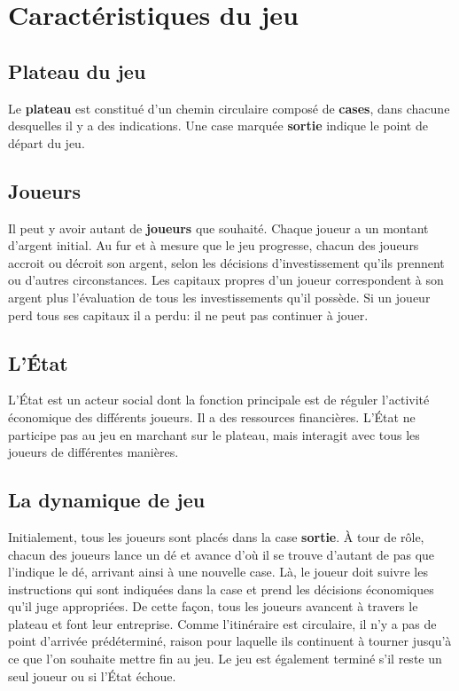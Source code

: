 \documentclass[12pt]{article}
\begin{document}
\section{Caractéristiques du jeu}

    \subsection{Plateau du jeu}
    Le \textbf{plateau} est constitué d'un chemin circulaire composé de \textbf{cases},
dans chacune desquelles il y a des indications. Une case marquée \textbf{sortie}
indique le point de départ du jeu.

    \subsection{Joueurs}
    Il peut y avoir autant de \textbf{joueurs} que souhaité. Chaque joueur a un
montant d'argent initial. Au fur et à mesure que le jeu progresse, chacun des joueurs accroit
ou décroit son argent, selon les décisions d'investissement qu'ils prennent ou d'autres
circonstances. Les capitaux propres d'un joueur correspondent à
son argent plus l'évaluation de tous les investissements qu'il possède.
Si un joueur perd tous ses capitaux il a perdu: il ne peut pas continuer à jouer.
    
    \subsection{L'\'Etat}
    L'\'Etat est un acteur social dont la fonction principale est de réguler l'activité économique des
différents joueurs. Il a des ressources financières. L'État ne participe pas
au jeu en marchant sur le plateau, mais interagit avec tous les joueurs de différentes manières.

    \subsection{La dynamique de jeu}
    Initialement, tous les joueurs sont placés dans la case \textbf{sortie}. À tour de rôle, chacun
des joueurs lance un dé et avance d'où il se trouve d'autant de pas que l'indique le
dé, arrivant ainsi à une nouvelle case. Là, le joueur doit suivre les instructions
qui sont indiquées dans la case et prend les décisions économiques qu'il juge appropriées.
De cette façon, tous les joueurs avancent à travers le plateau et font leur
entreprise. Comme l'itinéraire est circulaire, il n'y a pas de point d'arrivée prédéterminé,
raison pour laquelle ils continuent à tourner jusqu'à ce que l'on souhaite mettre fin au jeu.
Le jeu est également terminé s'il reste un seul joueur ou si l'État échoue.
    
\end{document}
